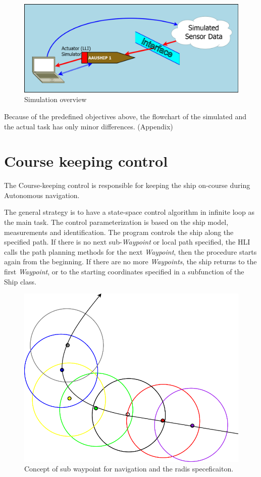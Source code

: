 \begin{figure}[htbp]
\centering
\includegraphics[width = \textwidth]{img/HLIFigures/ActorModel/SimModel.png}
\caption{Simulation overview}
\label{fig:sim_model}
\end{figure}

Because of the predefined objectives above, the flowchart of the simulated and the actual task has only minor differences. (Appendix)

\section{Course keeping control}

The Course-keeping control is responsible for keeping the ship on-course during Autonomous navigation.

The general strategy is to have a state-space control algorithm in infinite loop as the main task. The control parameterization is based on the ship model, measurements and identification.
The program controls the ship along the specified path. If there is no next sub-\emph{Waypoint} or local path specified, the HLI calls the path planning methods for the next \emph{Waypoint}, then the procedure starts again from the beginning. If there are no more \emph{Waypoints}, the ship returns to the first \emph{Waypoint}, or to the starting coordinates specified in a subfunction of the Ship class.

\begin{figure}[htbp]
\centering
\includegraphics[width = \textwidth]{img/HLIFigures/SWPNavigationConcept.png}
\caption{Concept of sub waypoint for navigation and the radis speceficaiton.}
\label{fig:swp_concept}
\end{figure}

